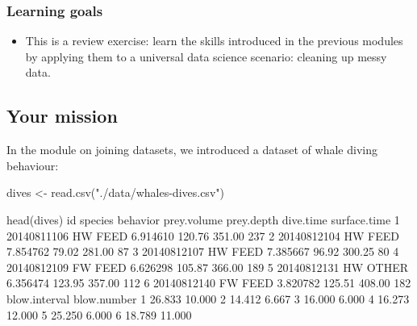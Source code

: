 \documentclass[
]{book}
\newenvironment{Shaded}{\begin{snugshade}}{\end{snugshade}}
\newcommand{\DecValTok}[1]{\textcolor[rgb]{0.00,0.00,0.81}{#1}}
\newcommand{\FloatTok}[1]{\textcolor[rgb]{0.00,0.00,0.81}{#1}}
\newcommand{\FunctionTok}[1]{\textcolor[rgb]{0.00,0.00,0.00}{#1}}
\newcommand{\NormalTok}[1]{#1}
\newcommand{\OtherTok}[1]{\textcolor[rgb]{0.56,0.35,0.01}{#1}}
\newcommand{\StringTok}[1]{\textcolor[rgb]{0.31,0.60,0.02}{#1}}
\providecommand{\tightlist}{%
  \setlength{\itemsep}{0pt}\setlength{\parskip}{0pt}}
\begin{document}
\hypertarget{learning-goals-20}{%
\subsubsection*{Learning goals}\label{learning-goals-20}}

\begin{itemize}
\tightlist
\item
  This is a review exercise: learn the skills introduced in the previous modules by applying them to a universal data science scenario: cleaning up messy data.
\end{itemize}

\hypertarget{your-mission}{%
\subsection*{Your mission}\label{your-mission}}

In the module on joining datasets, we introduced a dataset of whale diving behaviour:

\begin{Shaded}
\begin{Highlighting}[]
\NormalTok{dives }\OtherTok{\textless{}{-}} \FunctionTok{read.csv}\NormalTok{(}\StringTok{"./data/whales{-}dives.csv"}\NormalTok{)}
\end{Highlighting}
\end{Shaded}

\begin{Shaded}
\begin{Highlighting}[]
\FunctionTok{head}\NormalTok{(dives)}
\NormalTok{           id species behavior prey.volume prey.depth dive.time surface.time}
\DecValTok{1} \DecValTok{20140811106}\NormalTok{      HW     FEED    }\FloatTok{6.914610}     \FloatTok{120.76}    \FloatTok{351.00}          \DecValTok{237}
\DecValTok{2} \DecValTok{20140812104}\NormalTok{      HW     FEED    }\FloatTok{7.854762}      \FloatTok{79.02}    \FloatTok{281.00}           \DecValTok{87}
\DecValTok{3} \DecValTok{20140812107}\NormalTok{      HW     FEED    }\FloatTok{7.385667}      \FloatTok{96.92}    \FloatTok{300.25}           \DecValTok{80}
\DecValTok{4} \DecValTok{20140812109}\NormalTok{      FW     FEED    }\FloatTok{6.626298}     \FloatTok{105.87}    \FloatTok{366.00}          \DecValTok{189}
\DecValTok{5} \DecValTok{20140812131}\NormalTok{      HW    OTHER    }\FloatTok{6.356474}     \FloatTok{123.95}    \FloatTok{357.00}          \DecValTok{112}
\DecValTok{6} \DecValTok{20140812140}\NormalTok{      FW     FEED    }\FloatTok{3.820782}     \FloatTok{125.51}    \FloatTok{408.00}          \DecValTok{182}
\NormalTok{  blow.interval blow.number}
\DecValTok{1}        \FloatTok{26.833}      \FloatTok{10.000}
\DecValTok{2}        \FloatTok{14.412}       \FloatTok{6.667}
\DecValTok{3}        \FloatTok{16.000}       \FloatTok{6.000}
\DecValTok{4}        \FloatTok{16.273}      \FloatTok{12.000}
\DecValTok{5}        \FloatTok{25.250}       \FloatTok{6.000}
\DecValTok{6}        \FloatTok{18.789}      \FloatTok{11.000}
\end{Highlighting}
\end{Shaded}
\end{document}
